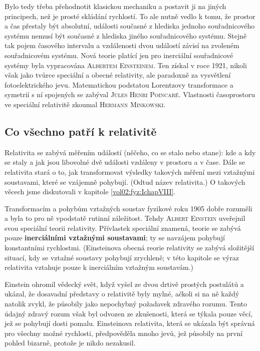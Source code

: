       Bylo tedy třeba přehodnotit klasickou mechaniku a postavit ji na jiných principech, než je
      prosté skládání rychlostí. To ale nutně vedlo k tomu, že prostor a čas přestaly být absolutní,
      události současné z hlediska jednoho souřadnicového systému nemusí být současné z hlediska
      jiného souřadnicového systému. Stejně tak pojem časového intervalu a vzdálenosti dvou událostí
      závisí na zvoleném souřadnicovém systému. Nová teorie platící jen pro inerciální souřadnicové
      systémy byla vypracována \textsc{Albertem Einsteinem}. Ten získal \wikiNobelPriceList v roce
      1921, nikoli však jako tvůrce speciální a obecné relativity, ale paradoxně za vysvětlení
      fotoelektrického jevu. Matematickou podstatou Lorentzovy transformace a symetrií s ní
      spojených se zabýval \textsc{Jules Henri Poincaré}. Vlastnosti časoprostoru ve speciální
      relativitě zkoumal \textsc{Hermann Minkowski}.

      \subsection{Co všechno patří k relativitě}
        Relativita se zabývá měřením událostí (něčeho, co se stalo nebo stane): kde a kdy se staly a
        jak jsou libovolné dvě události vzdáleny v prostoru a v čase. Dále se relativita stará o to,
        jak transformovat výsledky takových měření mezi vztažnými soustavami, které se vzájemně
        pohybují. (Odtud název relativita.) O takových věcech jsme diskutovali v kapitole
        \ref{vol02:fyz:IchapVIII}.

        Transformacím a pohybům vztažných soustav fyzikové roku 1905 dobře rozuměli a byla to pro ně
        vpodstatě rutinní záležitost. Tehdy \textsc{Albert Einstein} uveřejnil svou speciální teorii
        relativity. Přívlastek speciální znamená, teorie se zabývá pouze \textbf{inerciálními
        vztažnými soustavami}; ty se navzájem pohybují konstantními rychlostmi. (Einsteinova obecná
        reorie relativity se zabývá složitější situací, kdy se vztažné soustavy pohybují zrychleně;
        v této kapitole se výraz relativita vztahuje pouze k inerciálním vztažným soustavám.)
        
        Einstein ohromil vědecký svět, když vyšel ze dvou drtivě prostých postulátů a ukázal, že
        dosavadní představy o relativitě byly mylné, ačkoli si na ně každý natolik zvykl, že
        působily jako nepochybný požadavek zdravého rozumu. Tento údajný zdravý rozum však byl
        odvozen ze zkušenosti, která se týkala pouze věcí, jež se pohybují dosti pomalu. Einsteinova
        relativita, která se ukázala být správná pro všechny možné rychlosti, předpověděla mnoho
        jevů, jež působily na první pohled bizarně, protože je nikdo nezakusil.

